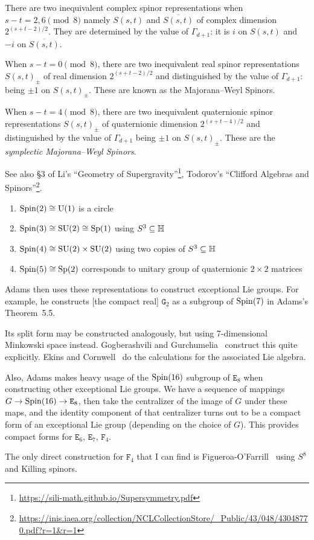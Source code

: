 \M
There are two inequivalent complex spinor representations when $s-t=2,6\pmod8$
namely $S(s,t)$ and $\overline{S(s,t)}$ of complex dimension
$2^{(s+t-2)/2}$. They are determined by the value of $\Gamma_{d+1}$: it is
$i$ on $S(s,t)$ and $-i$ on $\overline{S(s,t)}$.

When $s-t=0\pmod8$, there are two inequivalent real spinor
representations $S(s,t)_{\pm}$ of real dimension $2^{(s+t-2)/2}$ and
distinguished by the value of $\Gamma_{d+1}$: being $\pm1$ on $S(s,t)_{\pm}$.
These are known as the Majorana--Weyl Spinors.

When $s-t=4\pmod8$, there are two inequivalent quaternionic spinor
representations $S(s,t)_{\pm}$ of quaternionic dimension $2^{(s+t-4)/2}$
and distinguished by the value of $\Gamma_{d+1}$ being $\pm1$ on
$S(s,t)_{\pm}$.
These are the \emph{symplectic Majorana--Weyl Spinors}.

See also \S3 of Li's ``Geometry of Supergravity''\footnote{\url{https://sili-math.github.io/Supersymmetry.pdf}},
Todorov's ``Clifford Algebras and Spinors''\footnote{\url{https://inis.iaea.org/collection/NCLCollectionStore/_Public/43/048/43048770.pdf?r=1&r=1}}.


\begin{example}
\begin{enumerate}
\item $\operatorname{Spin}(2)\cong\operatorname{U}(1)$ is a circle
\item $\operatorname{Spin}(3)\cong\operatorname{SU}(2)\cong\operatorname{Sp}(1)$ using $S^{3}\subseteq\mathbb{H}$
\item $\operatorname{Spin}(4)\cong\operatorname{SU}(2)\times\operatorname{SU}(2)$ using two copies of $S^{3}\subseteq\mathbb{H}$
\item $\operatorname{Spin}(5)\cong\operatorname{Sp}(2)$ corresponds to unitary group of quaternionic
  $2\times2$ matrices
\end{enumerate}
\end{example}

\M
Adams then uses these representations to construct exceptional Lie
groups. For example, he constructs [the compact real] $\mathtt{G}_{2}$
as a subgroup of $\operatorname{Spin}(7)$ in Adams's Theorem~5.5.

Its split form may be constructed analogously, but using 7-dimensional
Minkowski space instead.
Gogberashvili and Gurchumelia~\cite{Gogberashvili:2019ojg} construct
this quite explicitly. Ekins and Cornwell~\cite{Ekins:1975yu} do the
calculations for the associated Lie algebra.

\M
Also, Adams makes heavy usage of the $\operatorname{Spin}(16)$ subgroup of
$\mathtt{E}_{8}$ when constructing other exceptional Lie groups.
We have a sequence of mappings $G\to\operatorname{Spin}(16)\to\mathtt{E}_{8}$,
then take the centralizer of the image of $G$ under these maps, and the
identity component of that centralizer turns out to be a compact form of
an exceptional Lie group (depending on the choice of $G$).
This provides compact forms for $\mathtt{E}_{6}$, $\mathtt{E}_{7}$,
$\mathtt{F}_{4}$.

The only direct construction for $\mathtt{F}_{4}$
that I can find is Figueroa-O'Farrill~\cite{Figueroa-OFarrill:2007jcv}
using $S^{8}$ and Killing spinors.
